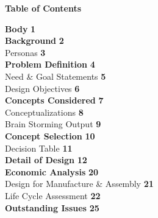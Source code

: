 \documentclass{article}
\begin{document}
\begin{titlepage}
    \centering
    
    {\Huge \bfseries Table of Contents\par}
    \vspace{2cm}
    
    \begin{flushleft}
    {\Large \textbf{Body}} \hfill \textbf{1} \\[1cm]

    {\Large \textbf{Background}} \hfill \textbf{2} \\[0.5cm]
    \hspace{1cm} Personas \hfill \textbf{3} \\[1cm]

    {\Large \textbf{Problem Definition}} \hfill \textbf{4} \\[0.5cm]
    \hspace{1cm} Need \& Goal Statements \hfill \textbf{5} \\[0.5cm]
    \hspace{1cm} Design Objectives \hfill \textbf{6} \\[1cm]

    {\Large \textbf{Concepts Considered}} \hfill \textbf{7} \\[0.5cm]
    \hspace{1cm} Conceptualizations \hfill \textbf{8} \\[0.5cm]
    \hspace{1cm} Brain Storming Output \hfill \textbf{9} \\[1cm]

    {\Large \textbf{Concept Selection}} \hfill \textbf{10} \\[0.5cm]
    \hspace{1cm} Decision Table \hfill \textbf{11} \\[1cm]

    {\Large \textbf{Detail of Design}} \hfill \textbf{12} \\[1cm]

    {\Large \textbf{Economic Analysis}} \hfill \textbf{20} \\[0.5cm]
    \hspace{1cm} Design for Manufacture \& Assembly \hfill \textbf{21} \\[0.5cm]
    \hspace{1cm} Life Cycle Assessment \hfill \textbf{22} \\[1cm]

    {\Large \textbf{Outstanding Issues}} \hfill \textbf{25} \\[1cm]


\end{flushleft}
\end{titlepage}
\end{document}
